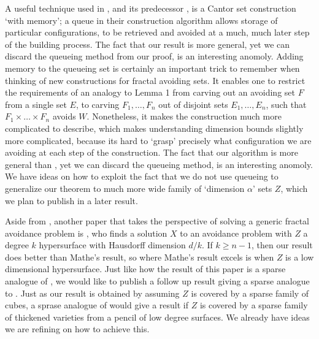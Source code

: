\documentclass{article}
\theoremstyle{plain}
\theoremstyle{plain}
\begin{document}
A useful technique used in \cite{MalabikaRob}, and its predecessor \cite{KeletiDimOneSet}, is a Cantor set construction `with memory'; a queue in their construction algorithm allows storage of particular configurations, to be retrieved and avoided at a much, much later step of the building process. The fact that our result is more general, yet we can discard the queueing method from our proof, is an interesting anomoly. Adding memory to the queueing set is certainly an important trick to remember when thinking of new constructions for fractal avoiding sets. It enables one to restrict the requirements of an analogy to Lemma 1 from carving out an avoiding set $F$ from a single set $E$, to carving $F_1, \dots, F_n$ out of disjoint sets $E_1, \dots, E_n$, such that $F_1 \times \dots \times F_n$ avoids $W$. Nonetheless, it makes the construction much more complicated to describe, which makes understanding dimension bounds slightly more complicated, because its hard to `grasp' precisely what configuration we are avoiding at each step of the construction. The fact that our algorithm is more general than \cite{MalabikaRob}, yet we can discard the queueing method, is an interesting anomoly. We have ideas on how to exploit the fact that we do not use queueing to generalize our theorem to much more wide family of `dimension $\alpha$' sets $Z$, which we plan to publish in a later result.

Aside from \cite{MalabikaRob}, another paper that takes the perspective of solving a generic fractal avoidance problem is \cite{Mathe}, who finds a solution $X$ to an avoidance problem with $Z$ a degree $k$ hypersurface with Hausdorff dimension $d/k$. If $k \geq n-1$, then our result does better than Mathe's result, so where Mathe's result excels is when $Z$ is a low dimensional hypersurface. Just like how the result of this paper is a sparse analogue of \cite{MalabikaRob}, we would like to publish a follow up result giving a sparse analogue to \cite{Mathe}. Just as our result is obtained by assuming $Z$ is covered by a sparse family of cubes, a sprase analogue of \cite{Mathe} would give a result if $Z$ is covered by a sparse family of thickened varieties from a pencil of low degree surfaces. We already have ideas we are refining on how to achieve this.
\end{document}
